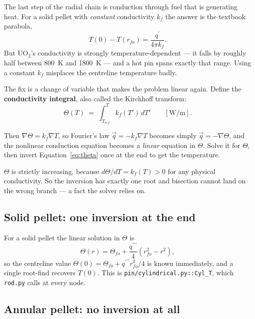 \documentclass[11pt]{article}
\newcommand{\code}[1]{\texttt{#1}}
\newcommand{\qp}{q^{\prime}}
\newcommand{\qppp}{q^{\prime\prime\prime}}
\begin{document}
The last step of the radial chain is conduction through fuel that is generating heat.
For a solid pellet with \emph{constant} conductivity $k_f$ the answer is the textbook
parabola,
\begin{equation}
T(0) - T(r_{fo}) = \frac{\qp}{4\pi k_f}.
\end{equation}
But UO$_2$'s conductivity is strongly temperature-dependent --- it falls by roughly
half between 800~K and 1800~K --- and a hot pin spans exactly that range. Using a
constant $k_f$ misplaces the centreline temperature badly.

The fix is a change of variable that makes the problem linear again. Define the
\textbf{conductivity integral}, also called the Kirchhoff transform:
\begin{equation}
\Theta(T) \;=\; \int_{T_{ref}}^{T} k_f(T')\,dT' \qquad [\mathrm{W/m}].
\label{eq:theta}
\end{equation}

Then $\nabla\Theta = k_f \nabla T$, so Fourier's law $\vec q = -k_f \nabla T$ becomes
simply $\vec q = -\nabla\Theta$, and the nonlinear conduction equation becomes a
\emph{linear} equation in $\Theta$. Solve it for $\Theta$, then invert
Equation~\eqref{eq:theta} once at the end to get the temperature.

$\Theta$ is strictly increasing, because $d\Theta/dT = k_f(T) > 0$ for any physical
conductivity. So the inversion has exactly one root and bisection cannot land on the
wrong branch --- a fact the solver relies on.

\subsection{Solid pellet: one inversion at the end}

For a solid pellet the linear solution in $\Theta$ is
\begin{equation}
\Theta(r) = \Theta_{fo} + \frac{\qppp}{4}\left(r_{fo}^2 - r^2\right),
\end{equation}
so the centreline value $\Theta(0) = \Theta_{fo} + \qppp r_{fo}^2/4$ is known
immediately, and a single root-find recovers $T(0)$. This is
\code{pin/cylindrical.py::Cyl\_T}, which \code{rod.py} calls at every node.

\subsection{Annular pellet: no inversion at all}
\label{sec:fluxsplit}
\end{document}
